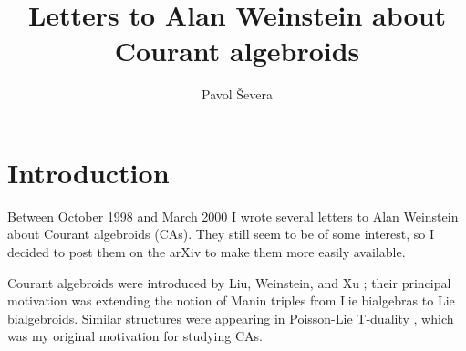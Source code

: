 \documentclass{article}
\begin{document}
\title{Letters to Alan Weinstein about Courant algebroids}
\author{Pavol \v Severa}
\date{}
\maketitle
\section*{Introduction}
Between October 1998 and March 2000 I wrote several letters to Alan Weinstein about Courant algebroids (CAs). They still seem to be of some interest, so I decided to post them on the arXiv to make them more easily available.

Courant algebroids were introduced by Liu, Weinstein, and Xu \cite{lwx}; their principal motivation was extending the notion of Manin triples from Lie bialgebras to Lie bialgebroids. Similar structures were appearing in Poisson-Lie T-duality \cite{ks}, which was my original motivation for studying CAs.
\end{document}
